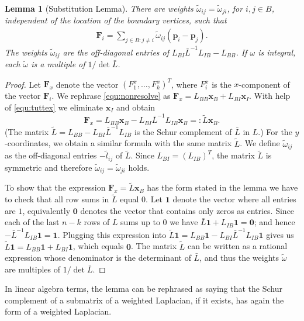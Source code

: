\documentclass{article}
\theoremstyle{plain} \newtheorem{thm}{Theorem}[section]
\newtheorem{lem}{Lemma}[section]
\newcommand{\ot}{\tilde{\omega}}
\begin{document}
\begin{lem}[Substitution Lemma] \label{lemma:1}
There are  weights $\ot_{ij} = \ot_{ji}$, for $i,j\in B$,
 independent of the location of the boundary vertices, such that 
 \begin{align*}
\mathbf{F}_i= \sum_{j\in B:j\not=i}
 \ot_{ij}(\mathbf{p}_i-\mathbf{p}_j).
 \end{align*}
The weights $\ot_{ij}$ are the off-diagonal entries of  $L_{BI}\bar{L}^{-1}L_{IB}-L_{BB}$.
If $\omega$ is integral,
each $\ot$ is a  multiple of $1/ \det \bar{L}$.
\end{lem}
\begin{proof}
Let $\mathbf{F}_x$ denote the vector $(F_1^x,\ldots,F_k^x)^T$, 
where $F_i^x$ is the $x$-component of the vector $\mathbf{F}_i$.
We rephrase \eqref{equ:nonresolve} as   
$\mathbf{F}_x=L_{BB}\mathbf{x}_B+L_{BI}\mathbf{x}_I$.
With help of \eqref{equ:tuttex} we eliminate $\mathbf{x}_I$ and 
obtain
\[ \mathbf{F}_x=L_{BB}\mathbf{x}_B-L_{BI}\bar{L}^{-1}L_{IB}\mathbf{x}_B 
 =:\tilde{L}\mathbf{x}_B.
 \]
(The matrix $\tilde L=L_{BB}-L_{BI}\bar{L}^{-1}L_{IB}$ is the Schur complement of $\bar{L}$ in $L$.)
For the $y$-coordinates, we obtain a similar formula with the same matrix $\tilde{L}$. 
We define $\ot_{ij}$ as the off-diagonal entries $-\tilde{l}_{ij}$ of
$\tilde{L}$. Since $L_{BI}=(L_{IB})^T$, the matrix $\tilde{L}$ is
symmetric and therefore $\ot_{ij}=\ot_{ji}$ holds. 

To show that the expression
$\mathbf{F}_x=\tilde{L}\mathbf{x}_B$ has the form stated in the lemma we have
to check that all row sums in $\tilde{L}$ equal 0. Let $\mathbf{1}$
denote the vector  where all entries are $1$, equivalently $\mathbf{0}$ denotes the vector that contains only zeros as entries. Since each of the last $n-k$ rows of $L$ sums up to $0$ we have $\bar{L}\mathbf{1}+L_{IB}\mathbf{1}=\mathbf{0}$; and hence 
$-\bar{L}^{-1}L_{IB}\mathbf{1}=\mathbf{1}$. Plugging this
  expression into
  $\tilde{L}\mathbf{1}=L_{BB}\mathbf{1}-L_{BI}\bar L^{-1}L_{IB}\mathbf{1}$ gives us 
$\tilde{L}\mathbf{1}= L_{BB}\mathbf{1}+L_{BI}\mathbf{1}$, which equals
$\mathbf{0}$. 
The matrix $\tilde{L}$ can be written as a rational expression whose
denominator is the determinant of $\bar L$, and thus the
weights $\ot$ are multiples of $1/ \det \bar{L}$.
\end{proof}

In linear algebra terms, the lemma can be rephrased as saying that the
Schur complement of a submatrix of a weighted Laplacian, if it exists,
has again the form of a weighted Laplacian.
\end{document}
